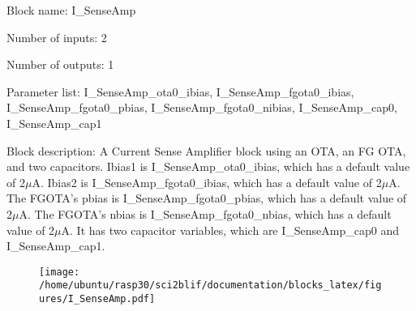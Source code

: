 \pagebreak

Block name: I\_SenseAmp

Number of inputs: 2

Number of outputs: 1

Parameter list: I\_SenseAmp\_ota0\_ibias, I\_SenseAmp\_fgota0\_ibias, I\_SenseAmp\_fgota0\_pbias, I\_SenseAmp\_fgota0\_nibias, I\_SenseAmp\_cap0, I\_SenseAmp\_cap1

Block description: 
A Current Sense Amplifier block using an OTA, an FG OTA, and two capacitors. Ibias1 is I\_SenseAmp\_ota0\_ibias, which has a default value of 2$\mu$A. Ibias2 is I\_SenseAmp\_fgota0\_ibias, which has a default value of 2$\mu$A. The FGOTA's pbias is I\_SenseAmp\_fgota0\_pbias, which has a default value of 2$\mu$A. The FGOTA's nbias is I\_SenseAmp\_fgota0\_nbias, which has a default value of 2$\mu$A. It has two capacitor variables, which are I\_SenseAmp\_cap0 and I\_SenseAmp\_cap1.

\begin{figure}[H]  %
\texttt{[image: /home/ubuntu/rasp30/sci2blif/documentation/blocks\_latex/figures/I\_SenseAmp.pdf]}
\end{figure}

